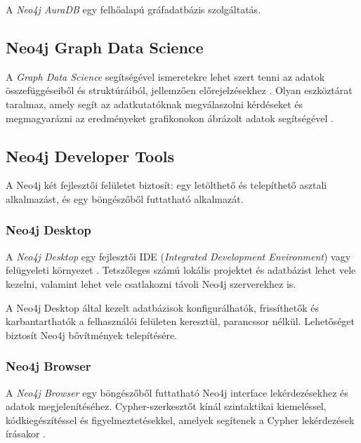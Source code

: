 A \textit{Neo4j AuraDB} egy felhőalapú gráfadatbázis szolgáltatás. 

\subsection{Neo4j Graph Data Science}

A \textit{Graph Data Science} segítségével ismeretekre lehet szert tenni az adatok összefüggéseiből és struktúráiból, jellemzően előrejelzésekhez . Olyan eszköztárat taralmaz, amely segít az adatkutatóknak megválaszolni kérdéseket és megmagyarázni az eredményeket grafikonokon ábrázolt adatok segítségével \cite{neo4j-graph-data-science}.

\subsection{Neo4j Developer Tools}

A Neo4j két fejlesztői felületet biztosít: egy letölthető és telepíthető asztali alkalmazást, és egy böngészőből futtatható alkalmazát.

\subsubsection{Neo4j Desktop}

A \textit{Neo4j Desktop} egy fejlesztői IDE (\textit{Integrated Development Environment}) vagy felügyeleti környezet \cite{neo4j-desktop}.
Tetszőleges számú lokális projektet és adatbázist lehet vele kezelni, valamint lehet vele csatlakozni távoli Neo4j szerverekhez is. 

A Neo4j Desktop által kezelt adatbázisok konfigurálhatók, frissíthetők és karbantarthatók a felhasználói felületen keresztül, parancssor nélkül. Lehetőséget biztosít Neo4j bővítmények telepítésére.

\subsubsection{Neo4j Browser}

A \textit{Neo4j Browser} egy böngészőből futtatható Neo4j interface lekérdezésekhez és adatok megjelenítéséhez. Cypher-szerkesztőt kínál szintaktikai kiemeléssel, kódkiegészítéssel és figyelmeztetésekkel, amelyek segítenek a Cypher lekérdezések írásakor \cite{neo4j-browser}.

